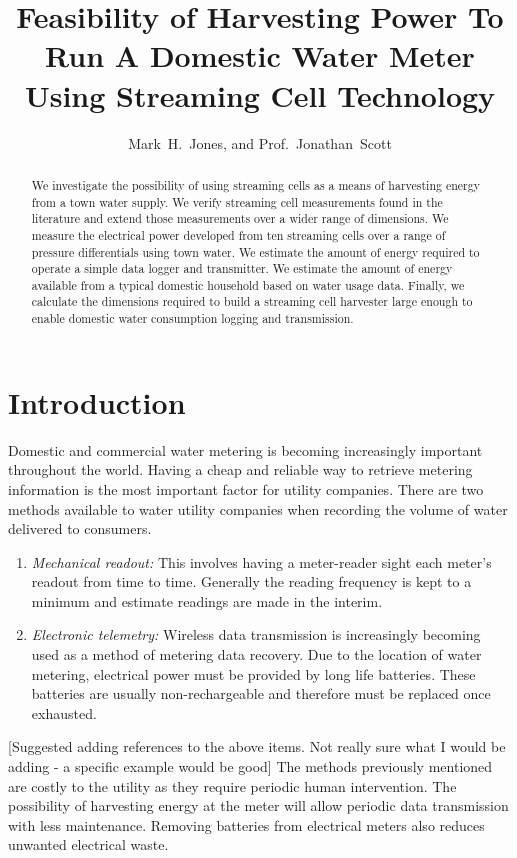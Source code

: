 \documentclass[10pt,final,journal]{IEEEtran}
\title{Feasibility of Harvesting Power To Run A Domestic Water Meter Using Streaming Cell Technology}
\author{Mark~H.~Jones, and Prof.~Jonathan~Scott}
\begin{document}
    \maketitle

    \begin{abstract}
        We investigate the possibility of using streaming cells as a means of harvesting energy from a town water supply.
        We verify streaming cell measurements found in the literature and extend those measurements over a wider range of dimensions.
        We measure the electrical power developed from ten streaming cells over a range of pressure differentials using town water.
        We estimate the amount of energy required to operate a simple data logger and transmitter.
        We estimate the amount of energy available from a typical domestic household based on water usage data.
        Finally, we calculate the dimensions required to build a streaming cell harvester large enough to enable domestic water consumption logging and transmission.
    \end{abstract}

    \section{Introduction}
    Domestic and commercial water metering is becoming increasingly important throughout the world.
    Having a cheap and reliable way to retrieve metering information is the most important factor for utility companies.
    There are two methods available to water utility companies when recording the volume of water delivered to consumers.
    \begin{enumerate}
        \item \emph{Mechanical readout:}
            This involves having a meter-reader sight each meter's readout from time to time.
            Generally the reading frequency is kept to a minimum and estimate readings are made in the interim.
        \item \emph{Electronic telemetry:}
            Wireless data transmission is increasingly becoming used as a method of metering data recovery.
            Due to the location of water metering, electrical power must be provided by long life batteries.
            These batteries are usually non-rechargeable and therefore must be replaced once exhausted.
        \end{enumerate}
    {\color{blue}[Suggested adding references to the above items. Not really sure what I would be adding - a specific example would be good]}
    The methods previously mentioned are costly to the utility as they require periodic human intervention.
    The possibility of harvesting energy at the meter will allow periodic data transmission with less maintenance.
    Removing batteries from electrical meters also reduces unwanted electrical waste.
\end{document}
